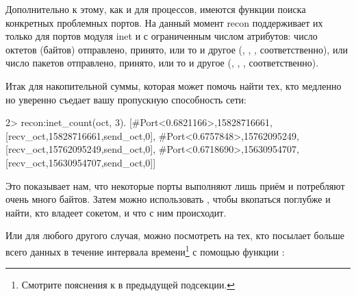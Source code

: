 \documentclass[11pt, oneside]{book}   	%
\begin{document}
Дополнительно к этому, как и для процессов, имеются функции поиска конкретных проблемных портов. На данный момент recon поддерживает их только для портов модуля inet и с ограниченным числом атрибутов: число октетов (байтов) отправлено, принято, или то и другое (, , , соответственно), или число пакетов отправлено, принято, или то и другое (, , , соответственно).

Итак для накопительной суммы, которая может помочь найти тех, кто медленно но уверенно съедает вашу пропускную способность сети:

\begin{VerbatimEshell}
2> recon:inet_count(oct, 3).
[{#Port<0.6821166>,15828716661,
  [{recv_oct,15828716661},{send_oct,0}]},
 {#Port<0.6757848>,15762095249,
  [{recv_oct,15762095249},{send_oct,0}]},
 {#Port<0.6718690>,15630954707,
  [{recv_oct,15630954707},{send_oct,0}]}]
\end{VerbatimEshell}

Это показывает нам, что некоторые порты выполняют лишь приём и потребляют очень много байтов. Затем можно использовать , чтобы вкопаться поглубже и найти, кто владеет сокетом, и что с ним происходит.

Или для любого другого случая, можно посмотреть на тех, кто посылает больше всего данных в течение интервала времени\footnote{Смотрите пояснения к  в предыдущей подсекции.} с помощью функции :
\end{document}
